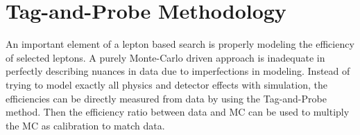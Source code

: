 

\FloatBarrier

\section{Tag-and-Probe Methodology}
An important element of a lepton based search is properly modeling the efficiency of selected leptons. A purely Monte-Carlo driven approach is inadequate in perfectly describing nuances in data due to imperfections in modeling. Instead of trying to model exactly all physics and detector effects with simulation, the efficiencies can be directly measured from data by using the Tag-and-Probe method. Then the efficiency ratio between data and MC can be used to multiply the MC as calibration to match data. 

